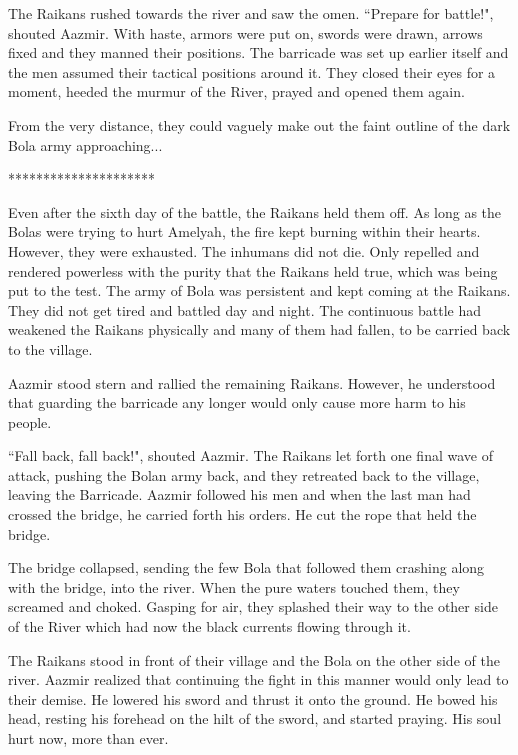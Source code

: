 \documentclass[twoside,11pt,titlepage]{article}
\begin{document}
The Raikans rushed towards the river and saw the omen. ``Prepare for battle!", shouted Aazmir. With haste, armors were put on, swords were drawn, arrows fixed and they manned their positions. The barricade was set up earlier itself and the men assumed their tactical positions around it. They closed their eyes for a moment, heeded the murmur of the River, prayed and opened them again.

From the very distance, they could vaguely make out the faint outline of the dark Bola army approaching...

\bigskip
\begin{center}
*********************
\end{center}

Even after the sixth day of the battle, the Raikans held them off. As long as the Bolas were trying to hurt Amelyah, the fire kept burning within their hearts. However, they were exhausted. The inhumans did not die. Only repelled and rendered powerless with the purity that the Raikans held true, which was being put to the test. The army of Bola was persistent and kept coming at the Raikans. They did not get tired and battled day and night. The continuous battle had weakened the Raikans physically and many of them had fallen, to be carried back to the village.

Aazmir stood stern and rallied the remaining Raikans. However, he understood that guarding the barricade any longer would only cause more harm to his people.

``Fall back, fall back!", shouted Aazmir. The Raikans let forth one final wave of attack, pushing the Bolan army back, and they retreated back to the village, leaving the Barricade. Aazmir followed his men and when the last man had crossed the bridge, he carried forth his orders. He cut the rope that held the bridge.

The bridge collapsed, sending the few Bola that followed them crashing along with the bridge, into the river. When the pure waters touched them, they screamed and choked. Gasping for air, they splashed their way to the other side of the River which had now the black currents flowing through it.

The Raikans stood in front of their village and the Bola on the other side of the river. Aazmir realized that continuing the fight in this manner would only lead to their demise. He lowered his sword and thrust it onto the ground. He bowed his head, resting his forehead on the hilt of the sword, and started praying. His soul hurt now, more than ever.
\end{document}
